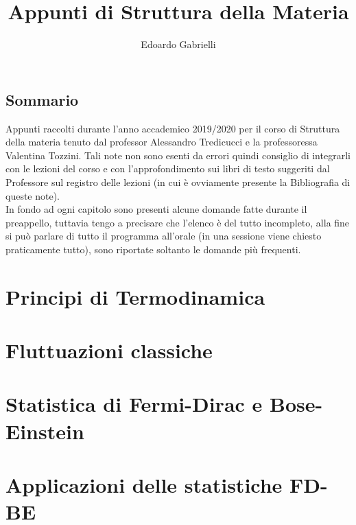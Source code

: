 

\author{Edoardo Gabrielli}
\title{Appunti di Struttura della Materia}


\maketitle

\section*{\centering Sommario}
Appunti raccolti durante l'anno accademico 2019/2020 per il corso di Struttura della materia tenuto dal professor Alessandro Tredicucci e la professoressa Valentina Tozzini. Tali note non sono esenti da errori quindi consiglio di integrarli con le lezioni del corso e con l'approfondimento sui libri di testo suggeriti dal Professore sul registro delle lezioni (in cui è ovviamente presente la Bibliografia di queste note).\\
In fondo ad ogni capitolo sono presenti alcune domande fatte durante il preappello, tuttavia tengo a precisare che l'elenco è del tutto incompleto, alla fine si può parlare di tutto il programma all'orale (in una sessione viene chiesto praticamente tutto), sono riportate soltanto le domande più frequenti.
\clearpage
\tableofcontents
\clearpage
\chapter{Principi di Termodinamica}






\chapter{Fluttuazioni classiche}

\chapter{Statistica di Fermi-Dirac e Bose-Einstein}




\chapter{Applicazioni delle statistiche FD-BE}





